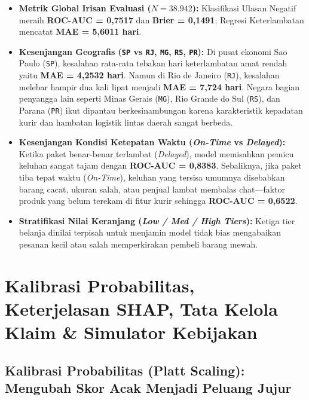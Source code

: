 \documentclass[11pt,a4paper,oneside]{book}
\newcommand{\code}[1]{{\small\nolinkurl{#1}}}
\begin{document}
\begin{itemize}
  \item \textbf{Metrik Global Irisan Evaluasi ($N = 38.942$):} Klasifikasi Ulasan Negatif meraih \textbf{ROC-AUC = 0,7517} dan \textbf{Brier = 0,1491}; Regresi Keterlambatan mencatat \textbf{MAE = 5,6011 hari}.
  \item \textbf{Kesenjangan Geografis (\code{SP} vs \code{RJ}, \code{MG}, \code{RS}, \code{PR}):} Di pusat ekonomi Sao Paulo (\code{SP}), kesalahan rata-rata tebakan hari keterlambatan amat rendah yaitu \textbf{MAE = 4,2532 hari}. Namun di Rio de Janeiro (\code{RJ}), kesalahan melebar hampir dua kali lipat menjadi \textbf{MAE = 7,724 hari}. Negara bagian penyangga lain seperti Minas Gerais (\code{MG}), Rio Grande do Sul (\code{RS}), dan Parana (\code{PR}) ikut dipantau berkesinambungan karena karakteristik kepadatan kurir dan hambatan logistik lintas daerah sangat berbeda.
  \item \textbf{Kesenjangan Kondisi Ketepatan Waktu (\emph{On-Time} vs \emph{Delayed}):} Ketika paket benar-benar terlambat (\emph{Delayed}), model memisahkan pemicu keluhan sangat tajam dengan \textbf{ROC-AUC = 0,8383}. Sebaliknya, jika paket tiba tepat waktu (\emph{On-Time}), keluhan yang tersisa umumnya disebabkan barang cacat, ukuran salah, atau penjual lambat membalas chat---faktor produk yang belum terekam di fitur kurir sehingga \textbf{ROC-AUC = 0,6522}.
  \item \textbf{Stratifikasi Nilai Keranjang (\emph{Low / Med / High Tiers}):} Ketiga tier belanja dinilai terpisah untuk menjamin model tidak bias mengabaikan pesanan kecil atau salah memperkirakan pembeli barang mewah.
\end{itemize}

\chapter{Kalibrasi Probabilitas, Keterjelasan SHAP, Tata Kelola Klaim \& Simulator Kebijakan}

\section{Kalibrasi Probabilitas (Platt Scaling): Mengubah Skor Acak Menjadi Peluang Jujur}
\end{document}
